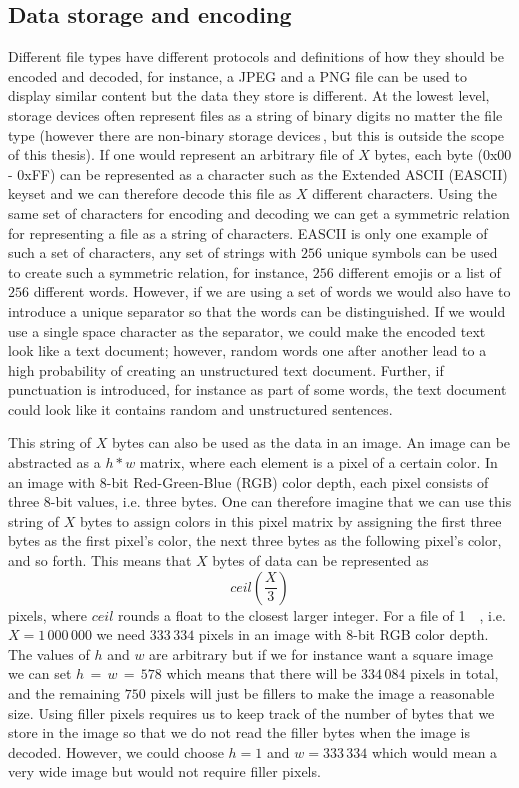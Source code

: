\subsection{Data storage and encoding}
\label{sec:data_storage}
Different file types have different protocols and definitions of how they should be encoded and decoded, for instance, a JPEG and a PNG file can be used to display similar content but the data they store is different. At the lowest level, storage devices often represent files as a string of binary digits no matter the file type (however there are non-binary storage devices\,\cite{MultistateDataStorage2020}, but this is outside the scope of this thesis). If one would represent an arbitrary file of $X$ bytes, each byte (0x00 - 0xFF) can be represented as a character such as the Extended ASCII (EASCII) keyset and we can therefore decode this file as $X$ different characters. Using the same set of characters for encoding and decoding we can get a symmetric relation for representing a file as a string of characters. EASCII is only one example of such a set of characters, any set of strings with $256$ unique symbols can be used to create such a symmetric relation, for instance, $256$ different emojis or a list of $256$ different words. However, if we are using a set of words we would also have to introduce a unique separator so that the words can be distinguished. If we would use a single space character as the separator, we could make the encoded text look like a text document; however, random words one after another lead to a high probability of creating an unstructured text document. Further, if punctuation is introduced, for instance as part of some words, the text document could look like it contains random and unstructured sentences.

This string of $X$ bytes can also be used as the data in an image. An image can be abstracted as a $h * w$ matrix, where each element is a pixel of a certain color. In an image with 8-bit Red-Green-Blue (RGB) color depth, each pixel consists of three 8-bit values, i.e. three bytes. One can therefore imagine that we can use this string of $X$ bytes to assign colors in this pixel matrix by assigning the first three bytes as the first pixel's color, the next three bytes as the following pixel's color, and so forth. This means that $X$ bytes of data can be represented as 
$$ceil(\frac{X}{3})$$ 
pixels, where $ceil$ rounds a float to the closest larger integer. For a file of \SI{1}{\mega\byte}, i.e. $X = 1\,000\,000$ we need $333\,334$ pixels in an image with 8-bit RGB color depth. The values of $h$ and $w$ are arbitrary but if we for instance want a square image we can set $ h\,=\,w\,=\,578$ which means that there will be $334\,084$ pixels in total, and the remaining $750$ pixels will just be fillers to make the image a reasonable size. Using filler pixels requires us to keep track of the number of bytes that we store in the image so that we do not read the filler bytes when the image is decoded. However, we could choose $h = 1$ and $w = 333\,334$ which would mean a very wide image but would not require filler pixels. 

